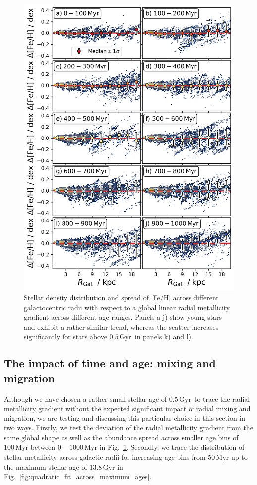 \documentclass[fleqn,usenatbib]{mnras}
\newcommand{\nihaoAGEmax}{$0.5\,\mathrm{Gyr}$}
\begin{document}
\begin{figure}
    \centering
    \includegraphics[width=\columnwidth]{figures/scatter_with_increasing_age.png}
    \caption{Stellar density distribution and spread of [Fe/H] across different galactocentric radii with respect to a global linear radial metallicity gradient across different age ranges. Panels a-j) show young stars and exhibit a rather similar trend, whereas the scatter increases significantly for stars above \nihaoAGEmax\ in panels k) and l).}
    \label{fig:scatter_with_increasing_age}
\end{figure}

\subsection{The impact of time and age: mixing and migration} \label{sec:discussion_time}

Although we have chosen a rather small stellar age of \nihaoAGEmax\ to trace the radial metallicity gradient without the expected significant impact of radial mixing and migration, we are testing and discussing this particular choice in this section in two ways. Firstly, we test the deviation of the radial metallicity gradient from the same global shape as well as the abundance spread across smaller age bins of $100\,\mathrm{Myr}$ between $0-1000\,\mathrm{Myr}$ in Fig.~\ref{fig:scatter_with_increasing_age}. Secondly, we trace the distribution of stellar metallicity across galactic radii for increasing age bins from $50\,\mathrm{Myr}$ up to the maximum stellar age of $13.8\,\mathrm{Gyr}$ in Fig.~\ref{fig:quadratic_fit_across_maximum_ages}.
\end{document}
